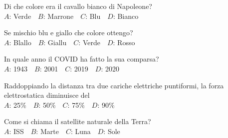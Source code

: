 \def\mcquestionnumber{5}


\mcquestionheader Di che colore era il cavallo bianco di Napoleone?\\
{$A$}: Verde\ \ {$B$}: Marrone\ \ {$C$}: Blu\ \ {$D$}: Bianco\ \ 

\mcquestionfooter



\def\mcquestionnumber{6}


\mcquestionheader Se mischio blu e giallo che colore ottengo?\\
{$A$}: Blallo\ \ {$B$}: Giallu\ \ {$C$}: Verde\ \ {$D$}: Rosso\ \ 

\mcquestionfooter



\def\mcquestionnumber{7}


\mcquestionheader In quale anno il COVID ha fatto la sua comparsa?\\
{$A$}: 1943\ \ {$B$}: 2001\ \ {$C$}: 2019\ \ {$D$}: 2020\ \ 

\mcquestionfooter



\def\mcquestionnumber{8}


\mcquestionheader Raddoppiando la distanza tra due cariche elettriche puntiformi, la forza elettrostatica diminuisce del\\
{$A$}: 25\%\ \ {$B$}: 50\%\ \ {$C$}: 75\%\ \ {$D$}: 90\%\ \ 

\mcquestionfooter



\def\mcquestionnumber{9}


\mcquestionheader Come si chiama il satellite naturale della Terra?\\
{$A$}: ISS\ \ {$B$}: Marte\ \ {$C$}: Luna\ \ {$D$}: Sole\ \ 

\mcquestionfooter



\def\mcquestionnumber{10}


